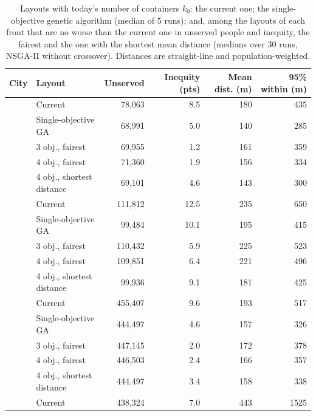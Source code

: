 \begin{table}[htbp]
\centering
\small
\caption{Layouts with today's number of containers $k_0$: the current one; the single-objective genetic algorithm (median of 5 runs); and, among the layouts of each front that are no worse than the current one in unserved people and inequity, the fairest and the one with the shortest mean distance (medians over 30 runs, NSGA-II without crossover). Distances are straight-line and population-weighted.}
\label{tab:k0}
\begin{tabular}{llrrrr}
\toprule
\textbf{City} & \textbf{Layout} & \textbf{Unserved} & \textbf{Inequity (pts)} & \textbf{Mean dist. (m)} & \textbf{95\% within (m)} \\
\midrule
{} & Current & 78,063 & 8.5 & 180 & 435 \\
 & Single-objective GA & 68,991 & 5.0 & 140 & 285 \\
 & 3 obj., fairest & 69,955 & 1.2 & 161 & 359 \\
 & 4 obj., fairest & 71,360 & 1.9 & 156 & 334 \\
 & 4 obj., shortest distance & 69,101 & 4.6 & 143 & 300 \\
\midrule
{} & Current & 111,812 & 12.5 & 235 & 650 \\
 & Single-objective GA & 99,484 & 10.1 & 195 & 415 \\
 & 3 obj., fairest & 110,432 & 5.9 & 225 & 523 \\
 & 4 obj., fairest & 109,851 & 6.4 & 221 & 496 \\
 & 4 obj., shortest distance & 99,936 & 9.1 & 181 & 425 \\
\midrule
{} & Current & 455,407 & 9.6 & 193 & 517 \\
 & Single-objective GA & 444,497 & 4.6 & 157 & 326 \\
 & 3 obj., fairest & 447,145 & 2.0 & 172 & 378 \\
 & 4 obj., fairest & 446,503 & 2.4 & 166 & 357 \\
 & 4 obj., shortest distance & 444,497 & 3.4 & 158 & 338 \\
\midrule
{} & Current & 438,324 & 7.0 & 443 & 1525 \\

\end{tabular}
\end{table}
